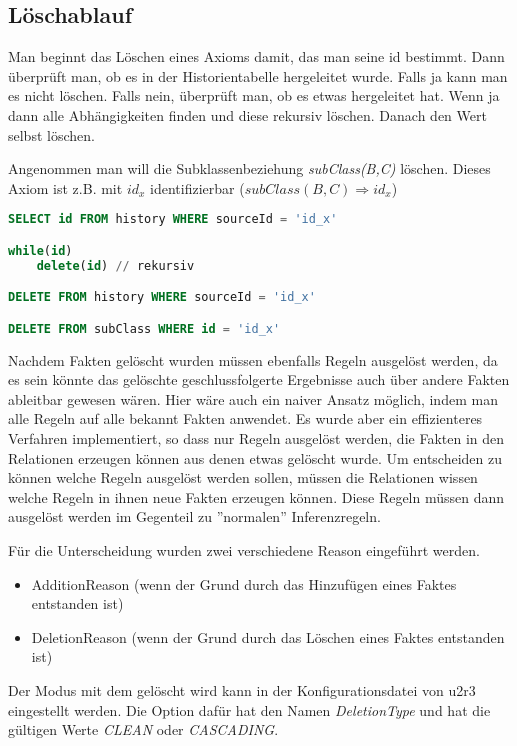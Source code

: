 \subsection{Löschablauf}
Man beginnt das Löschen eines Axioms damit, das man seine id bestimmt. Dann überprüft man, ob es in der Historientabelle hergeleitet wurde. Falls ja kann man es nicht löschen. Falls nein, überprüft man, ob es etwas hergeleitet hat. Wenn ja dann alle Abhängigkeiten finden und diese rekursiv löschen. Danach den Wert selbst löschen.

Angenommen man will die Subklassenbeziehung \emph{subClass(B,C)} löschen. Dieses Axiom ist z.B. mit $id_x$ identifizierbar ($subClass(B,C) \Rightarrow id_x$)
\begin{lstlisting}[language=SQL]
SELECT id FROM history WHERE sourceId = 'id_x'

while(id)
	delete(id) // rekursiv

DELETE FROM history WHERE sourceId = 'id_x'

DELETE FROM subClass WHERE id = 'id_x'
\end{lstlisting}


Nachdem Fakten gelöscht wurden müssen ebenfalls Regeln ausgelöst werden, da es sein könnte das gelöschte geschlussfolgerte Ergebnisse auch über andere Fakten ableitbar gewesen wären. 
Hier wäre auch ein naiver Ansatz möglich, indem man alle Regeln auf alle bekannt Fakten anwendet. Es wurde aber ein effizienteres Verfahren implementiert, so dass nur Regeln ausgelöst werden, die Fakten in den Relationen erzeugen können aus denen etwas gelöscht wurde.
Um entscheiden zu können welche Regeln ausgelöst werden sollen, müssen die Relationen wissen welche Regeln in ihnen neue Fakten erzeugen können. Diese Regeln müssen dann ausgelöst werden im Gegenteil zu ''normalen'' Inferenzregeln.

Für die Unterscheidung wurden zwei verschiedene Reason eingeführt werden.
\begin{itemize}
  \item AdditionReason (wenn der Grund durch das Hinzufügen eines Faktes entstanden ist)
  \item DeletionReason (wenn der Grund durch das Löschen eines Faktes entstanden ist)
\end{itemize}

Der Modus mit dem gelöscht wird kann in der Konfigurationsdatei von u2r3 eingestellt werden. Die Option dafür hat den Namen \emph{DeletionType} und hat die gültigen Werte \emph{CLEAN} oder \emph{CASCADING}.

